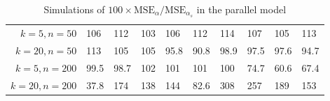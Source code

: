 
\begin{table}[ht]
\centering
\caption{Simulations of $100 \times \textrm{MSE}_\alpha/\textrm{MSE}_{\alpha_s}$ in the parallel model}
\begin{tabular}{rlllllllll}
$k = 5, n = 50$ & 106 & 112 & 103 & 106 & 112 & 114 & 107 & 105 & 113 \\
  $k = 20, n = 50$ & 113 & 105 & 105 & 95.8 & 90.8 & 98.9 & 97.5 & 97.6 & 94.7 \\
  $k = 5, n = 200$ & 99.5 & 98.7 & 102 & 101 & 101 & 100 & 74.7 & 60.6 & 67.4 \\
  $k = 20, n = 200$ & 37.8 & 174 & 138 & 144 & 82.6 & 308 & 257 & 189 & 153 \\
  \end{tabular}
\end{table}
\newcommand{\geomean}{1.08}

